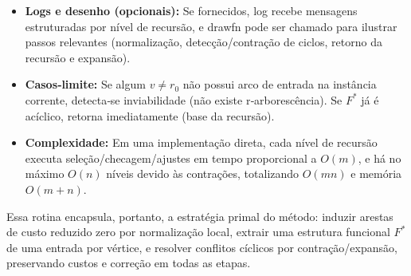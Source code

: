 \documentclass[12pt,a4paper]{article}
\def\texttt#1{#1}%
\def\_{}%
\begin{document}
\begin{itemize}
    \item \textbf{Logs e desenho (opcionais):} Se fornecidos, \texttt{log} recebe mensagens estruturadas por nível de recursão, e \texttt{draw\_fn} pode ser chamado para ilustrar passos relevantes (normalização, detecção/contração de ciclos, retorno da recursão e expansão).
    \item \textbf{Casos‑limite:} Se algum \(v\neq r_0\) não possui arco de entrada na instância corrente, detecta‑se inviabilidade (não existe r‑arborescência). Se \(F^*\) já é acíclico, retorna imediatamente (base da recursão).
    \item \textbf{Complexidade:} Em uma implementação direta, cada nível de recursão executa seleção/checagem/ajustes em tempo proporcional a \(O(m)\), e há no máximo \(O(n)\) níveis devido às contrações, totalizando \(O(mn)\) e memória \(O(m+n)\).
\end{itemize}

Essa rotina encapsula, portanto, a estratégia primal do método: induzir arestas de custo reduzido zero por normalização local, extrair uma estrutura funcional \(F^*\) de uma entrada por vértice, e resolver conflitos cíclicos por contração/expansão, preservando custos e correção em todas as etapas.
\end{document}
